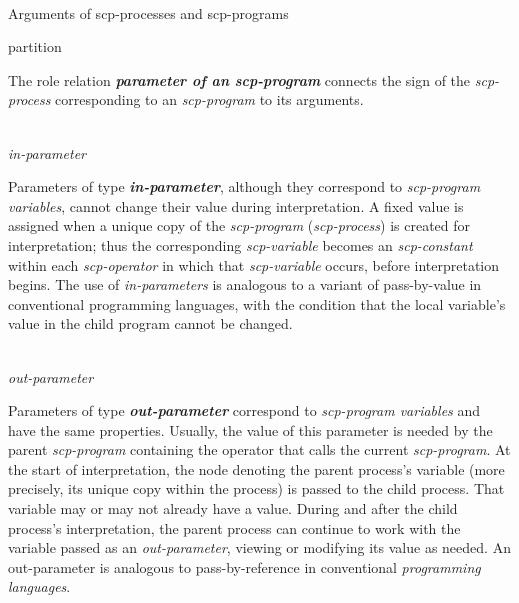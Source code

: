 \begin{frame}{\\Arguments of scp-processes and scp-programs}
	\topline
	\RaggedRight

	\begin{SCn}
		\begin{scnrelfromset}{partition}
		\end{scnrelfromset}
	\end{SCn}

	The role relation \textbf{\textit{parameter of an scp-program\scnrolesign}} connects the sign of the \textit{\mbox{scp-process}} corresponding to an \textit{scp-program} to its arguments.

\end{frame}


\begin{frame}{\\\textit{in-parameter\scnrolesign}}
	\topline
	\RaggedRight

	Parameters of type \textbf{\textit{in-parameter\scnrolesign}}, although they correspond to \textit{scp-program variables\scnrolesign}, cannot change their value during interpretation. A fixed value is assigned when a unique copy of the \textit{scp-program} (\textit{scp-process}) is created for interpretation; thus the corresponding \textit{scp-variable\scnrolesign} becomes an \textit{scp-constant\scnrolesign} within each \textit{scp-operator} in which that \textit{scp-variable\scnrolesign} occurs, before interpretation begins. The use of \textit{in-parameters} is analogous to a variant of pass-by-value in conventional programming languages, with the condition that the local variable's value in the child program cannot be changed.

\end{frame}

\begin{frame}{\\\textit{out-parameter\scnrolesign}}
	\topline
	\RaggedRight

	\vspace{10mm}

	Parameters of type \textbf{\textit{out-parameter\scnrolesign}} correspond to \textit{scp-program variables\scnrolesign} and have the same properties. Usually, the value of this parameter is needed by the parent \textit{scp-program} containing the operator that calls the current \textit{scp-program}. At the start of interpretation, the node denoting the parent process's variable (more precisely, its unique copy within the process) is passed to the child process. That variable may or may not already have a value. During and after the child process's interpretation, the parent process can continue to work with the variable passed as an \textit{out-parameter\scnrolesign}, viewing or modifying its value as needed. An out-parameter is analogous to pass-by-reference in conventional \textit{programming languages}.

\end{frame}

